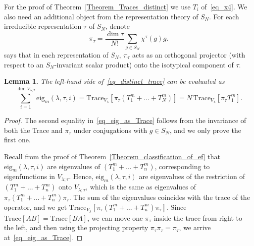 \documentclass[11pt]{article}
\newtheorem{lemma}[theo]{Lemma}
\theoremstyle{definition}
\numberwithin{equation}{section}
\begin{document}
For the proof of Theorem~\ref{Theorem_Traces_distinct} we use $T_i$ of~\eqref{eq_x4}. We also need an additional object from the representation theory of $S_N$. For each irreducible representation $\tau$ of $S_N$, denote
\begin{equation}
\label{eq_projector}
 \pi_\tau= \frac{\dim \tau}{N!} \sum_{g\in S_N} \chi^\tau(g) g.
\end{equation}
\cite[Theorem 8]{serre1977linear} says that in each representation of $S_N$, $\pi_\tau$ acts as an orthogonal projector (with respect to an $S_N$-invariant scalar product) onto the isotypical component of $\tau$.


\begin{lemma} \label{Lemma_projector}
 The left-hand side of~\eqref{eq_distinct_trace} can be evaluated as
 \begin{equation}
 \label{eq_eig_as_Trace}
   \sum_{i=1}^{\dim V_{\lambda,\tau}} \mathrm{eig}_m(\lambda,\tau,i) =\mathrm{Trace}_{V_\lambda} \left[\pi_\tau (T_1^m+\dots+T_N^m)\right]= N\,  \mathrm{Trace}_{V_\lambda} \left[\pi_\tau T_1^m\right].
 \end{equation}
\end{lemma}
\begin{proof}
 The second equality in~\eqref{eq_eig_as_Trace} follows from the invariance of both the Trace and $\pi_\tau$ under conjugations with $g\in S_N$, and we only prove the first one.

 Recall from the proof of Theorem~\ref{Theorem_classification_of_ef} that $\mathrm{eig}_m(\lambda,\tau,i)$ are eigenvalues of $(T_1^m+\dots+T_n^m)$, corresponding to eigenfunctions in $V_{\lambda;\tau}$. Hence, $\mathrm{eig}_m(\lambda,\tau,i)$ are eigenvalues of the restriction of $(T_1^m+\dots+T_n^m)$ onto $V_{\lambda;\tau}$, which is the same as eigenvalues of $\pi_\tau (T_1^m+\dots+T_n^m) \pi_\tau$. The sum of the eigenvalues coincides with the trace of the operator, and we get $\mathrm{Trace}_{V_\lambda} \left[\pi_\tau (T_1^m+\dots+T_n^m)\pi_\tau\right]$. Since $\mathrm{Trace}[AB]=\mathrm{Trace}[BA]$, we can move one $\pi_\tau$ inside the trace from right to the left, and then using the projecting property $\pi_\tau \pi_\tau=\pi_\tau$, we arrive at~\eqref{eq_eig_as_Trace}.
\end{proof}
\end{document}
